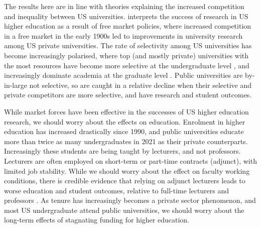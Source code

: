 The results here are in line with theories explaining the increased competition and inequality between US universities.
\cite{urquiola2020markets} interprets the success of research in US higher education as a result of free market policies, where increased competition in a free market in the early 1900s led to improvements in university research among US private universities.
The rate of selectivity among US universities has become increasingly polarised, where top (and mostly private) universities with the most resources have become more selective at the undergraduate level \citep{hoxby2009changing}, and increasingly dominate academia at the graduate level \citep{wapman2022quantifying}.
Public universities are by-in-large not selective, so are caught in a relative decline when their selective and private competitors are more selective, and have research and student outcomes.

While market forces have been effective in the successes of US higher education research, we should worry about the effects on education.
Enrolment in higher education has increased drastically since 1990, and public universities educate more than twice as many undergraduates in 2021 as their private counterparts.
Increasingly these students are being taught by lecturers, and not professors.
Lecturers are often employed on short-term or part-time contracts (adjunct), with limited job stability.
While we should worry about the effect on faculty working conditions, there is credible evidence that relying on adjunct lecturers leads to worse education and student outcomes, relative to full-time lecturers and professors \citep{zhu2021limited}.
As tenure has increasingly becomes a private sector phenomenon, and most US undergraduate attend public universities, we should worry about the long-term effects of stagnating funding for higher education.
